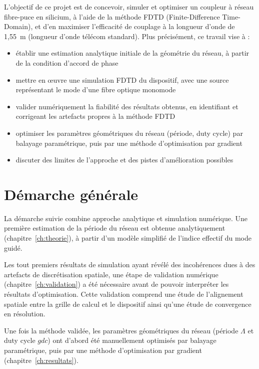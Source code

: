 \documentclass[a4paper,11pt]{report}
\begin{document}
L'objectif de ce projet est de concevoir, simuler et optimiser un coupleur à réseau fibre-puce en silicium, à l'aide de la méthode FDTD (Finite-Difference Time-Domain), et d'en maximiser l'efficacité de couplage à la longueur d'onde de 1{,}55~\textmu m (longueur d'onde télécom standard). Plus précisément, ce travail vise à :

\begin{itemize}
    \item établir une estimation analytique initiale de la géométrie du réseau, à partir de la condition d'accord de phase 
    \item mettre en œuvre une simulation FDTD du dispositif, avec une source représentant le mode d'une fibre optique monomode 
    \item valider numériquement la fiabilité des résultats obtenus, en identifiant et corrigeant les artefacts propres à la méthode FDTD 
    \item optimiser les paramètres géométriques du réseau (période, duty cycle) par balayage paramétrique, puis par une méthode d'optimisation par gradient 
    \item discuter des limites de l'approche et des pistes d'amélioration possibles
\end{itemize}

\section{Démarche générale}

La démarche suivie combine approche analytique et simulation numérique. Une première estimation de la période du réseau est obtenue analytiquement (chapitre~\ref{ch:theorie}), à partir d'un modèle simplifié de l'indice effectif du mode guidé. 

Les tout premiers résultats de simulation ayant révélé des incohérences dues à des artefacts de discrétisation spatiale, une étape de validation numérique (chapitre~\ref{ch:validation}) a été nécessaire avant de pouvoir interpréter les résultats d'optimisation. Cette validation comprend une étude de l'alignement spatiale entre la grille de calcul et le dispositif ainsi qu'une étude de convergence en résolution.

Une fois la méthode validée, les paramètres géométriques du réseau (période $\Lambda$ et duty cycle $gdc$) ont d'abord été manuellement optimisés par balayage paramétrique, puis par une méthode d'optimisation par gradient (chapitre~\ref{ch:resultats}).
\end{document}
